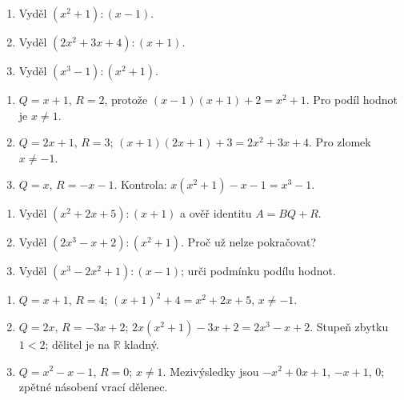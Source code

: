 \documentclass[11pt,a4paper]{article}
\begin{document}

\begin{zadaniReseniBox}[title={Procvičení},breakable=false]
\begin{enumerate}[label=\alph*)]
\item Vyděl $(x^2+1):(x-1)$.
\item Vyděl $(2x^2+3x+4):(x+1)$.
\item Vyděl $(x^3-1):(x^2+1)$.
\end{enumerate}
\tcblower
\begin{enumerate}[label=\alph*)]
\item $Q=x+1$, $R=2$, protože $(x-1)(x+1)+2=x^2+1$. Pro podíl hodnot je $x\ne1$.
\item $Q=2x+1$, $R=3$; $(x+1)(2x+1)+3=2x^2+3x+4$. Pro zlomek $x\ne-1$.
\item $Q=x$, $R=-x-1$. Kontrola: $x(x^2+1)-x-1=x^3-1$.
\end{enumerate}
\end{zadaniReseniBox}






\begin{zadaniReseniBox}[title={Domácí dělení se zbytkem},breakable=false]
\begin{enumerate}[label=\alph*)]
\item Vyděl $(x^2+2x+5):(x+1)$ a ověř identitu $A=BQ+R$.
\item Vyděl $(2x^3-x+2):(x^2+1)$. Proč už nelze pokračovat?
\item Vyděl $(x^3-2x^2+1):(x-1)$; urči podmínku podílu hodnot.
\end{enumerate}
\tcblower
\begin{enumerate}[label=\alph*)]
\item $Q=x+1$, $R=4$; $(x+1)^2+4=x^2+2x+5$, $x\ne-1$.
\item $Q=2x$, $R=-3x+2$; $2x(x^2+1)-3x+2=2x^3-x+2$. Stupeň zbytku $1<2$; dělitel je na $\mathbb R$ kladný.
\item $Q=x^2-x-1$, $R=0$; $x\ne1$. Mezivýsledky jsou $-x^2+0x+1$, $-x+1$, $0$; zpětné násobení vrací dělenec.
\end{enumerate}
\end{zadaniReseniBox}
\end{document}
